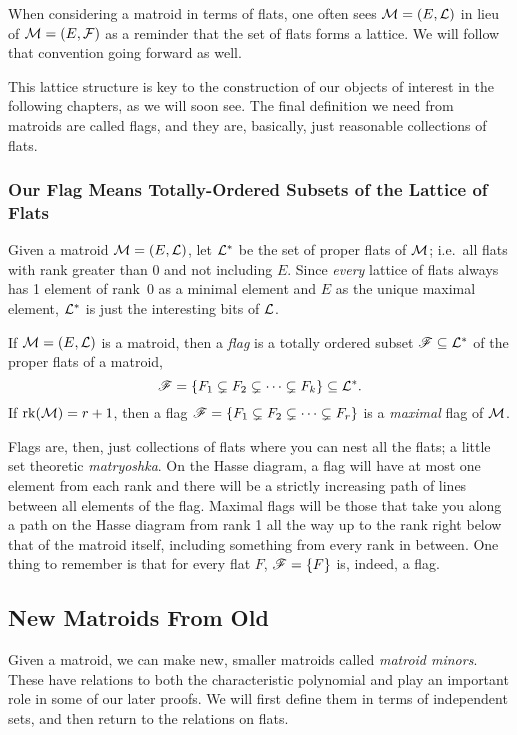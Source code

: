\documentclass[12pt,oneside]{../../sfsuthesis}
\begin{document}
When considering a matroid in terms of flats, one often sees \( \mathcal{M} = (E, \mathcal{L}) \) in lieu of \( \mathcal{M} = (E, \mathcal{F}) \) as a reminder that the set of flats forms a lattice.
We will follow that convention going forward as well.

This lattice structure is key to the construction of our objects of interest in the following chapters, as we will soon see.
The final definition we need from matroids are called flags, and they are, basically, just reasonable collections of flats.

\subsubsection{Our Flag Means Totally-Ordered Subsets of the Lattice of Flats}

Given a matroid \( \mathcal{M} = (E, \mathcal{L}) \), let \( \mathcal{L}^\ast \) be the set of proper flats of \( \mathcal{M} \);
i.e.\ all flats with rank greater than 0 and not including \( E \).
Since \textit{every} lattice of flats always has 1 element of rank~0 as a minimal element and \( E \) as the unique maximal element, \( \mathcal{L}^\ast \) is just the interesting bits of \( \mathcal{L} \).

\begin{definition}[Flag]\label{def:flag}

    If \( \mathcal{M} = (E, \mathcal{L}) \) is a matroid, then a \emph{flag} is a totally ordered subset \( \mathscr{F} \subseteq \mathcal{L}^\ast \) of the proper flats of a matroid,
    \[
        \mathscr{F} = \{ F_1 \subsetneq F_2 \subsetneq \cdots \subsetneq F_k \} \subseteq \mathcal{L}^\ast.
    \]
    If \( \operatorname{rk}(\mathcal{M}) = r + 1 \), then a flag \( \mathscr{F} = \{ F_1 \subsetneq F_2 \subsetneq \cdots \subsetneq F_r \} \) is a \emph{maximal} flag of \( \mathcal{M} \).

\end{definition}

Flags are, then, just collections of flats where you can nest all the flats; a little set theoretic \textit{matryoshka}.
On the Hasse diagram, a flag will have at most one element from each rank and there will be a strictly increasing path of lines between all elements of the flag.
Maximal flags will be those that take you along a path on the Hasse diagram from rank 1 all the way up to the rank right below that of the matroid itself, including something from every rank in between.
One thing to remember is that for every flat \( F \), \( \mathscr{F} = \{ F \} \) is, indeed, a flag.

\subsection{New Matroids From Old}
Given a matroid, we can make new, smaller matroids called \emph{matroid minors}.
These have relations to both the characteristic polynomial and play an important role in some of our later proofs.
We will first define them in terms of independent sets, and then return to the relations on flats.
\end{document}
